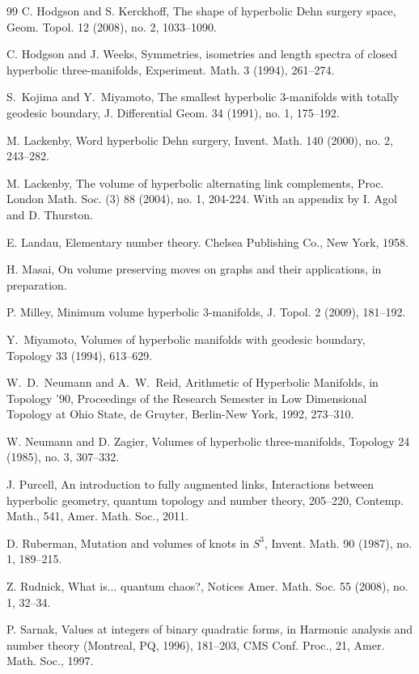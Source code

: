 \documentclass[reqno]{amsproc}  %
\begin{document}
\begin{thebibliography}{99}
 C. Hodgson and S. Kerckhoff, The shape of hyperbolic Dehn surgery space,
Geom. Topol. {12} (2008), no. 2, 1033--1090. 

 C. Hodgson and J. Weeks, {Symmetries, isometries and length spectra of closed hyperbolic  three-manifolds},  Experiment. Math. 3 (1994),  261--274.

S.~Kojima and Y.~Miyamoto, 
{The smallest hyperbolic 3-manifolds with totally geodesic boundary},
 J. Differential Geom. {34} (1991), no. 1, 175--192.

 M. Lackenby, Word hyperbolic Dehn surgery, Invent. Math. 140 (2000), no. 2, 243--282. 

 M. Lackenby, The volume of hyperbolic alternating link complements, 
Proc. London Math. Soc. (3) 88 (2004), no. 1, 204-224. 
With an appendix by I. Agol and D. Thurston.

E. Landau, Elementary number theory.
Chelsea Publishing Co., New York, 1958.

 H. Masai, On volume preserving moves on graphs and their applications, in preparation.

 P. Milley, 
{Minimum volume hyperbolic 3-manifolds},
{J. Topol.} 2 (2009), {181--192}.

Y.~Miyamoto, 
{Volumes of hyperbolic manifolds with geodesic boundary},
Topology {33} (1994), 613--629. 

W.~D.~Neumann and A.~W.~Reid,
 {Arithmetic of Hyperbolic Manifolds},
in {Topology '90, Proceedings of the Research Semester in Low
  Dimensional Topology at Ohio State},  de Gruyter,
  Berlin-New York, 1992, 273--310.

 W. Neumann and D. Zagier, Volumes of hyperbolic three-manifolds,
Topology 24 (1985), no. 3, 307--332. 

 J. Purcell, An introduction to fully augmented links, 
 Interactions between hyperbolic geometry, quantum topology and number theory, 205--220,
Contemp. Math., 541, Amer. Math. Soc., 2011. 
  
D. Ruberman, Mutation and volumes of knots in $S^3$,
Invent. Math. 90 (1987), no. 1, 189--215.

Z. Rudnick,  What is... quantum chaos?,
Notices Amer. Math. Soc. 55 (2008), no. 1, 32--34. 

P. Sarnak,  Values at integers of binary quadratic forms, in 
Harmonic analysis and number theory (Montreal, PQ, 1996), 181--203, CMS Conf. Proc., 21, Amer. Math. Soc., 1997.


\end{thebibliography}
\end{document}
